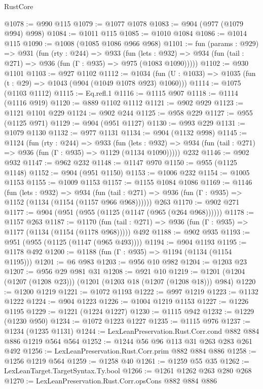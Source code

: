 \begin{lexlean}{RustCore}
\begin{coremodule}
@1078 := @990 @115
@1079 := @1077 @1078
@1083 := @904 (@977 (@1079 @994) @998)
@1084 := @1011 @115
@1085 := @1010 @1084
@1086 := @1014 @115
@1090 := @1008 (@1085 @1086 @966 @968)
@1101 := fun (params : @929) =>
  @931
    (fun (rty : @244) =>
    @933
      (fun (lets : @932) =>
      @934 (fun (tail : @271) => @936 (fun (Γ : @935) => @975 (@1083 @1090)))))
@1102 := @930 @1101
@1103 := @927 @1102
@1112 := @1034 (fun (U : @1033) => @1035 (fun (t : @29) => @1043 (@904 (@1049 @1078 @923) @1060)))
@1114 := @1075 (@1103 @1112)
@1115 := Eq.refl.{1}
@1116 := @1115 @907
@1118 := @1114 (@1116 @919)
@1120 := @889 @1102 @1112
@1121 := @902 @929
@1123 := @1121 @1101 @229
@1124 := @902 @244
@1125 := @958 @229
@1127 := @955 (@1125 @971)
@1129 := @904 (@951 @1127)
@1130 := @993 @229
@1131 := @1079 @1130
@1132 := @977 @1131
@1134 := @904 (@1132 @998)
@1145 := @1124
    (fun (rty : @244) =>
    @933
      (fun (lets : @932) =>
      @934 (fun (tail : @271) => @936 (fun (Γ : @935) => @1129 (@1134 @1090)))))
    @232
@1146 := @902 @932
@1147 := @962 @232
@1148 := @1147 @970
@1150 := @955 (@1125 @1148)
@1152 := @904 (@951 @1150)
@1153 := @1006 @232
@1154 := @1005 @1153
@1155 := @1009 @1153
@1157 := @1155 @1084 @1086
@1169 := @1146
    (fun (lets : @932) =>
    @934 (fun (tail : @271) => @936 (fun (Γ : @935) => @1152 (@1134 (@1154 (@1157 @966 @968))))))
    @263
@1170 := @902 @271
@1177 := @904 (@951 (@955 (@1125 (@1147 (@965 (@264 @968))))))
@1178 := @1157 @263
@1187 := @1170
    (fun (tail : @271) => @936 (fun (Γ : @935) => @1177 (@1134 (@1154 (@1178 @968)))))
    @492
@1188 := @902 @935
@1193 := @951 (@955 (@1125 (@1147 (@965 @493))))
@1194 := @904 @1193
@1195 := @1178 @492
@1200 := @1188 (fun (Γ : @935) => @1194 (@1134 (@1154 @1195)))
@1201 := @6 @983
@1203 := @956 @10 @982
@1204 := @1203 @23
@1207 := @956 @29 @981 @31
@1208 := @921 @10
@1219 := @1201 (@1204 (@1207 (@1208 @23))) (@1201 (@1203 @18 (@1207 (@1208 @18))) @984)
@1220 := @1200 @1219
@1221 := @1072 @1193
@1222 := @997 @1219
@1223 := @1132 @1222
@1224 := @904 @1223
@1226 := @1004 @1219 @1153
@1227 := @1226 @1195
@1229 := @1221 (@1224 @1227)
@1230 := @1115 @942
@1232 := @1229 (@1230 @950)
@1234 := @1072 @1223 @1227
@1235 := @1115 @976
@1237 := @1234 (@1235 @1131)
@1244 := LexLeanPreservation.Rust.Corr.cond @882 @884 @886 @1219 @564 @564
@1252 := @1244 @56 @96 @113 @31 @263 @283 @261 @492
@1256 := LexLeanPreservation.Rust.Corr.prim @882 @884 @886
@1258 := @1256 @1219 @564
@1259 := @1258 @40
@1261 := @1259 @55 @35
@1262 := LexLeanTarget.TargetSyntax.Ty.bool
@1266 := @1261 @1262 @263 @280 @268
@1270 := LexLeanPreservation.Rust.Corr.opsCons @882 @884 @886

\end{coremodule}
\end{lexlean}
